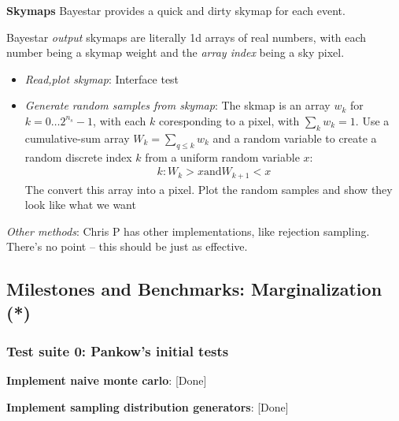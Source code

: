 \documentclass[twocolumn,prd,nofootinbib]{revtex4}
\newcommand\editremark[1]{{\color{red} #1}}
\begin{document}
\begin{widetext}
\begin{widetext}
\noindent \textbf{Skymaps} Bayestar provides a quick and dirty skymap for each event.  

 Bayestar \emph{output} skymaps are literally 1d arrays of real numbers, with each
number being a skymap weight and the \emph{array index} being a sky pixel.  

\begin{itemize}
\item \emph{Read,plot skymap}: Interface test
\item \emph{Generate random samples from skymap}: The skmap is an array $w_k$ for $k=0\ldots 2^{n_s}-1$, with each $k$
  coresponding to a pixel, with $\sum_k w_k=1$.  Use a cumulative-sum array $W_k = \sum_{q\le k} w_k$ and a random
  variable to create a random discrete index $k$ from a uniform random variable $x$:
\begin{eqnarray}
k : W_k > x \text{and} W_{k+1} < x
\end{eqnarray}
The convert this array into a pixel. Plot the random samples and show they look like what we want
\end{itemize}

\noindent  \emph{Other methods}: Chris P has other implementations, like rejection sampling.  There's no point -- this
should be just as effective.

\subsection{Milestones and Benchmarks: Marginalization (*)}



\subsubsection{Test suite 0: Pankow's initial tests}
\noindent \textbf{Implement naive monte carlo}: [Done]

\noindent \textbf{Implement sampling distribution generators}: [Done]



\end{widetext}
\end{widetext}
\end{document}
